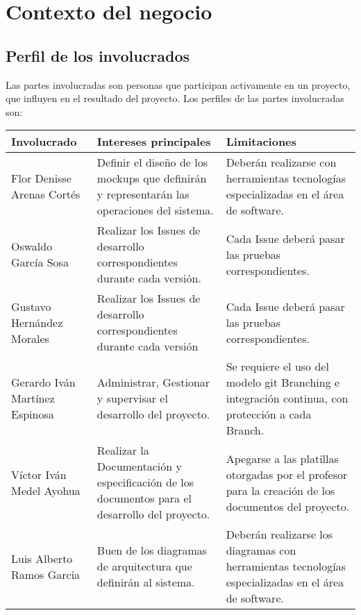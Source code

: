 \documentclass[12pt,a4paper]{book}
\begin{document}
\chapter{Contexto del negocio}
\section{Perfil de los involucrados}
Las partes involucradas son personas que participan activamente en un proyecto, que influyen en el resultado del proyecto. Los perfiles de las partes involucradas son:
\begin{table}[h!]
\begin{tabular}{|p{5 cm}|p{5 cm}|p{5 cm}|}
\hline
\textbf{Involucrado}&\textbf{Intereses principales}&\textbf{Limitaciones}
\\\hline

Flor Denisse Arenas Cortés&Definir el diseño de los mockups que definirán y representarán las operaciones del sistema. & Deberán realizarse con herramientas tecnologías especializadas en el área de software.\\\hline

Oswaldo García Sosa&Realizar los Issues de desarrollo correspondientes durante cada versión. &Cada Issue deberá pasar las pruebas correspondientes.\\\hline

Gustavo Hernández Morales&Realizar los Issues de desarrollo correspondientes durante cada versión &Cada Issue deberá pasar las pruebas correspondientes.\\\hline

Gerardo Iván Martínez Espinosa & Administrar, Gestionar y supervisar el desarrollo del proyecto.&Se requiere el uso del modelo git Branching e integración continua, con protección a cada Branch.\\\hline

Víctor Iván Medel Ayohua &Realizar la Documentación y especificación de los documentos para el desarrollo del proyecto.&Apegarse a las platillas otorgadas por el profesor para la creación de los documentos del proyecto.\\\hline

Luis Alberto Ramos Garcia&Buen de los diagramas de arquitectura que definirán al sistema. & Deberán realizarse los diagramas con herramientas tecnologías especializadas en el área de software.\\\hline
\end{tabular}
\end{table}
\newpage
\end{document}
